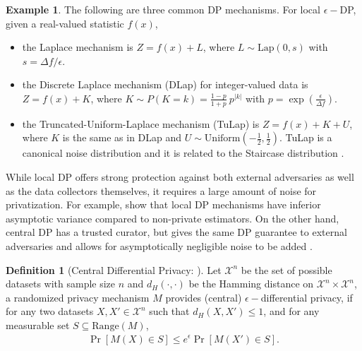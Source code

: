 \documentclass{article}
\theoremstyle{definition}
\newtheorem{example}{Example}
\newtheorem{definition}[theorem]{Definition}
\begin{document}
\begin{example} \label{ex: epsilon DP mechanisms}
The following are three common DP mechanisms. %
For local $\epsilon-$DP, given a real-valued statistic $f(x)$,
    \begin{itemize}
    \item the Laplace mechanism is $Z = f(x) + L$, where $L \sim \text{Lap}(0,s)$ with $s =\Delta f/\epsilon$.
    \item the Discrete Laplace mechanism (DLap) \citep{Inusah_Kozubowski_2006, ghosh2009universally} for integer-valued data is $Z = f(x) + K$, where $K \sim P(K = k) = \frac{1-p}{1+p} \ p^{|k|}$ with $p = \exp{\left( \frac{\epsilon}{\Delta f} \right)}$.
    \item the Truncated-Uniform-Laplace mechanism (TuLap) \citep{Awan_Slavković_2018} is $Z = f(x) + K + U$, where $K$ is the same as in DLap and $U \sim \text{Uniform}(-\frac{1}{2}, \frac{1}{2})$. TuLap is a canonical noise distribution \citep{awan2023canonical} and it is related to the Staircase distribution \citep{geng2015optimal}.
    \end{itemize}    
\end{example}

While local DP offers strong protection against both external adversaries as well as the data collectors themselves, it requires a large amount of noise for privatization. For example, \citet{duchi2013local} show that local DP mechanisms have inferior asymptotic variance compared to non-private estimators. On the other hand, central DP has a trusted curator, but gives the same DP guarantee to external adversaries and allows for asymptotically negligible noise to be added \citep{smith2011privacy-preserving, barber2014privacy}.


\begin{definition}[Central Differential Privacy: \citet{dwork2006calibrating}]
    Let $\mathcal{X}^n$ be the set of possible datasets with sample size $n$ and $d_H(\cdot, \cdot)$ be the Hamming distance on $\mathcal{X}^n \times \mathcal{X}^n$, a randomized privacy mechanism ${M}$ provides (central) $\epsilon-$differential privacy, if for any two  datasets $X, X' \in \mathcal{X}^n$ such that $d_H(X, X') \leq 1$, and for any measurable set $S \subseteq \text{Range}({M})$,
    \begin{align*}
        \Pr[{M}(X) \in S] \leq e^{\epsilon} \Pr[{M}(X') \in S].
    \end{align*}
\end{definition}
\end{document}

